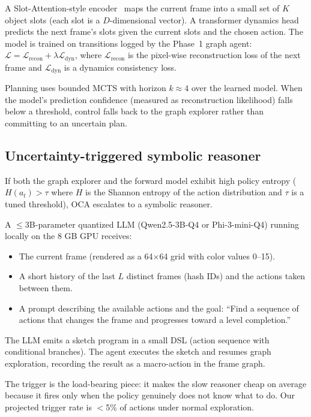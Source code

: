 \documentclass[10pt,letterpaper]{article}
\begin{document}
A Slot-Attention-style encoder~\cite{locatello2020slot} maps the current frame into a small set of $K$ object slots (each slot is a $D$-dimensional vector).
A transformer dynamics head predicts the next frame's slots given the current slots and the chosen action.
The model is trained on transitions logged by the Phase~1 graph agent: $\mathcal{L} = \mathcal{L}_{\text{recon}} + \lambda \mathcal{L}_{\text{dyn}}$, where $\mathcal{L}_{\text{recon}}$ is the pixel-wise reconstruction loss of the next frame and $\mathcal{L}_{\text{dyn}}$ is a dynamics consistency loss.

Planning uses bounded MCTS with horizon $k \approx 4$ over the learned model.
When the model's prediction confidence (measured as reconstruction likelihood) falls below a threshold, control falls back to the graph explorer rather than committing to an uncertain plan.

\subsection{Uncertainty-triggered symbolic reasoner}\label{sec:method-trigger}

If both the graph explorer and the forward model exhibit high policy entropy ($H(a_t) > \tau$ where $H$ is the Shannon entropy of the action distribution and $\tau$ is a tuned threshold), OCA escalates to a symbolic reasoner.

A $\leq$3B-parameter quantized LLM (Qwen2.5-3B-Q4 or Phi-3-mini-Q4) running locally on the 8 GB GPU receives:
\begin{itemize}
    \item The current frame (rendered as a 64$\times$64 grid with color values 0--15).
    \item A short history of the last $L$ distinct frames (hash IDs) and the actions taken between them.
    \item A prompt describing the available actions and the goal: ``Find a sequence of actions that changes the frame and progresses toward a level completion.''
\end{itemize}
The LLM emits a sketch program in a small DSL (action sequence with conditional branches).
The agent executes the sketch and resumes graph exploration, recording the result as a macro-action in the frame graph.

The trigger is the load-bearing piece: it makes the slow reasoner cheap on average because it fires only when the policy genuinely does not know what to do.
Our projected trigger rate is $<$5\% of actions under normal exploration.
\end{document}
